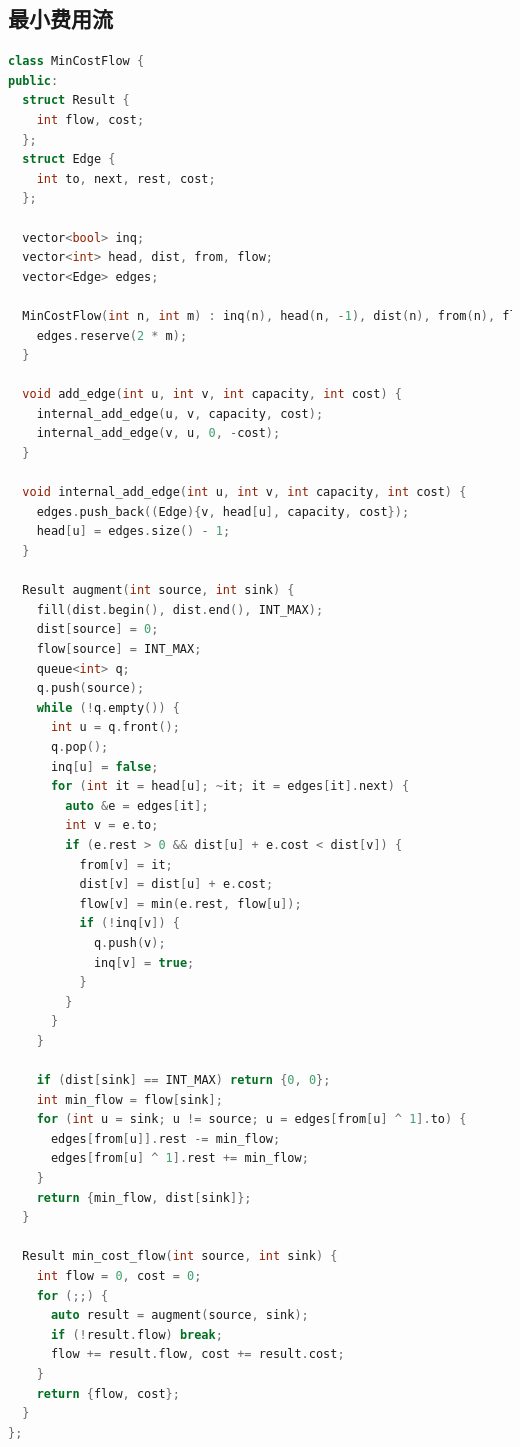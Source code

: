 \documentclass[twoside]{article}
\begin{document}
\subsection{最小费用流}
\begin{lstlisting}[language=c++]
class MinCostFlow {
public:
  struct Result {
    int flow, cost;
  };
  struct Edge {
    int to, next, rest, cost;
  };

  vector<bool> inq;
  vector<int> head, dist, from, flow;
  vector<Edge> edges;

  MinCostFlow(int n, int m) : inq(n), head(n, -1), dist(n), from(n), flow(n) {
    edges.reserve(2 * m);
  }

  void add_edge(int u, int v, int capacity, int cost) {
    internal_add_edge(u, v, capacity, cost);
    internal_add_edge(v, u, 0, -cost);
  }

  void internal_add_edge(int u, int v, int capacity, int cost) {
    edges.push_back((Edge){v, head[u], capacity, cost});
    head[u] = edges.size() - 1;
  }

  Result augment(int source, int sink) {
    fill(dist.begin(), dist.end(), INT_MAX);
    dist[source] = 0;
    flow[source] = INT_MAX;
    queue<int> q;
    q.push(source);
    while (!q.empty()) {
      int u = q.front();
      q.pop();
      inq[u] = false;
      for (int it = head[u]; ~it; it = edges[it].next) {
        auto &e = edges[it];
        int v = e.to;
        if (e.rest > 0 && dist[u] + e.cost < dist[v]) {
          from[v] = it;
          dist[v] = dist[u] + e.cost;
          flow[v] = min(e.rest, flow[u]);
          if (!inq[v]) {
            q.push(v);
            inq[v] = true;
          }
        }
      }
    }

    if (dist[sink] == INT_MAX) return {0, 0};
    int min_flow = flow[sink];
    for (int u = sink; u != source; u = edges[from[u] ^ 1].to) {
      edges[from[u]].rest -= min_flow;
      edges[from[u] ^ 1].rest += min_flow;
    }
    return {min_flow, dist[sink]};
  }

  Result min_cost_flow(int source, int sink) {
    int flow = 0, cost = 0;
    for (;;) {
      auto result = augment(source, sink);
      if (!result.flow) break;
      flow += result.flow, cost += result.cost;
    }
    return {flow, cost};
  }
};

\end{lstlisting}
\end{document}
